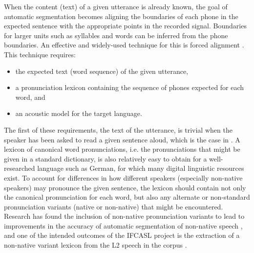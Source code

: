 	
	When the content (text) of a given utterance is already known, the goal of automatic segmentation becomes aligning the  boundaries of each phone in the expected sentence with the appropriate points in the recorded signal. Boundaries for larger units such as syllables and words can be inferred from the phone boundaries. 
	An effective and widely-used technique for this is forced
	alignment \citep{Fohr1996,Mesbahi2011,Fohr2012,Fauth2014}.
	This technique 
	requires:
	\begin{itemize}
	\item the expected text (word sequence) of the given utterance, 
	\item a pronunciation lexicon containing the sequence of phones expected for each word, and
	\item an acoustic model for the target language.
	\end{itemize}
	
	The first of these requirements, the text of the utterance, is trivial when the speaker has been asked to read a given sentence aloud, which is the case in .
	A lexicon of canonical word pronunciations, i.e. the pronunciations that might be given in a standard dictionary, is also relatively easy to obtain for a well-researched language such as German, for which many digital linguistic resources exist.
	 To account for differences in how different speakers (especially non-native speakers) may pronounce the given sentence, 
	the lexicon should contain not only the canonical pronunciation for each word, but also any alternate or non-standard pronunciation variants (native or non-native) that might be encountered. Research  has found the inclusion of non-native pronunciation variants to lead to improvements in the accuracy of automatic segmentation of non-native speech \citep{Jouvet2011,Mesbahi2011,Bonneau2012,Orosanu2012}, and one of the intended outcomes of the IFCASL project is the extraction of a non-native variant lexicon from the L2 speech in the corpus .
	
